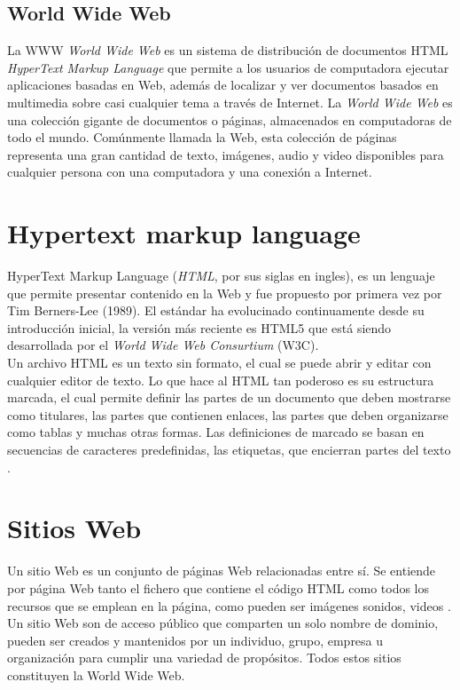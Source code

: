 
\subsection{World Wide Web}

La WWW \textit{World Wide Web} es un sistema de distribución de documentos HTML \textit{HyperText Markup Language} 
que permite a los usuarios de computadora ejecutar aplicaciones basadas en Web, además de localizar y ver documentos 
basados en multimedia sobre casi cualquier tema a través de Internet.
La \textit{World Wide Web} es una colección gigante de documentos o páginas, almacenados en computadoras de todo el mundo. 
Comúnmente llamada la Web, esta colección de páginas representa una gran cantidad de texto, imágenes, audio y video disponibles 
para cualquier persona con una computadora y una conexión a Internet.

\section[HTML]{Hypertext markup language}
HyperText Markup Language (\textit{HTML}, por sus siglas en ingles), 
es un lenguaje que permite presentar contenido en la Web y fue propuesto por primera vez por 
Tim Berners-Lee (1989). El estándar ha evolucinado continuamente desde su introducción inicial, 
la versión más reciente es HTML5 que está siendo desarrollada por el \textit{World Wide Web Consurtium} (W3C).
\\
Un archivo HTML es un texto sin formato, el cual se puede abrir y editar con cualquier editor de 
texto. Lo que hace al HTML tan poderoso es su estructura marcada, el cual permite definir las partes 
de un documento que deben mostrarse como titulares, las partes que contienen enlaces, las partes que deben 
organizarse como tablas y muchas otras formas. Las definiciones de marcado se basan en secuencias de caracteres 
predefinidas, las etiquetas, que encierran partes del texto \citep{CTHTML}. 


\section{Sitios Web}
Un sitio Web es un conjunto de páginas Web relacionadas entre sí. Se entiende por página Web tanto el fichero 
que contiene el código HTML como todos los recursos que se emplean en la página, como pueden ser
imágenes sonidos, videos \citep{CTsW}.
Un sitio Web son de acceso público que comparten un solo nombre de dominio, pueden ser creados y 
mantenidos por un individuo, grupo, empresa u organización para cumplir una variedad de propósitos. 
Todos estos sitios constituyen la World Wide Web. 

